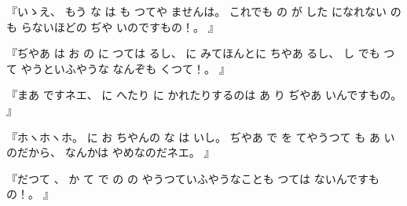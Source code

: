 %
『いゝえ、
%
もう
な
は
も
つてや
ませんは。
%
これでも
の
が
した
になれない
の
も
らないほどの
ぢや
いのですもの！。
』

%
『ぢやあ
は
お
の
に
つては
るし、
%
に
みてほんとに
ちやあ
るし、
%
し
でも
つて
やうといふやうな
なんぞも
くつて！。
』

%
『まあ
ですネエ、
%
に
へたり
に
かれたりするのは
あ
り
ぢやあ
いんですもの。
』

%
『ホヽホヽホ。
%
に
お
ちやんの
な
は
いし。
%
ぢやあ
で
を
てやうつて
も
あ
いのだから、
%
なんかは
やめなのだネエ。
』

%
『だつて
、
%
か
て
で
の
の
やうつていふやうなことも
つては
ないんですもの！。
』
